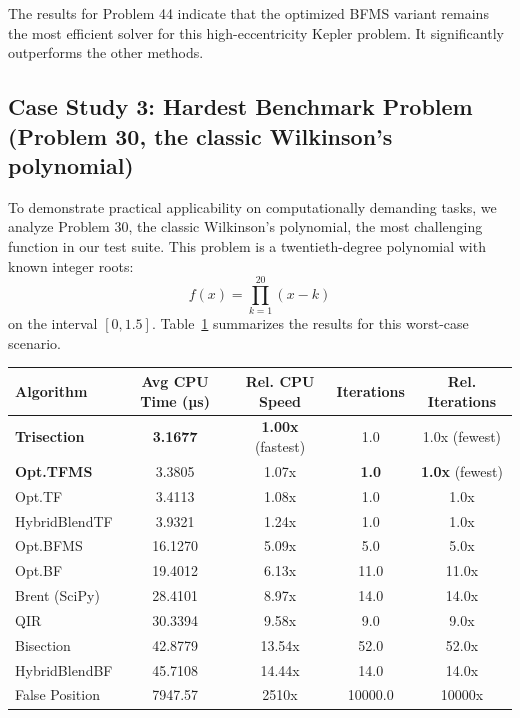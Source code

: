 \documentclass[amsmath, amssymb, aps]{revtex4-2}
\begin{document}
The results for Problem 44 indicate that the optimized BFMS variant remains the most efficient solver for this high-eccentricity Kepler problem. It significantly outperforms the other methods.

\subsection*{Case Study 3: Hardest Benchmark Problem (Problem 30, the classic Wilkinson's polynomial)}
To demonstrate practical applicability on computationally demanding tasks, we analyze Problem 30, the classic Wilkinson's polynomial, the most challenging function in our test suite. This problem is a twentieth-degree polynomial with known integer roots:
\[
f(x) = \prod_{k=1}^{20} (x - k)
\]
on the interval $[0, 1.5]$. Table~\ref{tab:realworld3} summarizes the results for this worst-case scenario.

\begin{table}[H]
\centering
{}
\label{tab:realworld3}
\begin{tabular}{lcccc}
\hline
Algorithm              & Avg CPU Time (µs) & Rel. CPU Speed          & Iterations & Rel. Iterations         \\
\hline
\textbf{Trisection}    & \textbf{3.1677}   & \textbf{1.00x} (fastest)      & 1.0           & 1.0x (fewest)          \\
\textbf{Opt.TFMS}      & 3.3805            & 1.07x                        & \textbf{1.0}  & \textbf{1.0x} (fewest) \\
Opt.TF                 & 3.4113            & 1.08x                        & 1.0           & 1.0x                   \\
HybridBlendTF          & 3.9321            & 1.24x                        & 1.0           & 1.0x                   \\
Opt.BFMS               & 16.1270           & 5.09x                        & 5.0           & 5.0x                   \\
Opt.BF                 & 19.4012           & 6.13x                        & 11.0          & 11.0x                  \\
Brent (SciPy)          & 28.4101           & 8.97x                        & 14.0          & 14.0x                  \\
QIR                    & 30.3394           & 9.58x                        & 9.0           & 9.0x                   \\
Bisection              & 42.8779           & 13.54x                       & 52.0          & 52.0x                  \\
HybridBlendBF          & 45.7108           & 14.44x                       & 14.0          & 14.0x                  \\
False Position         & 7947.57           & 2510x                        & 10000.0       & 10000x                 \\
\hline
\hline
\end{tabular}
\end{table}
\end{document}
